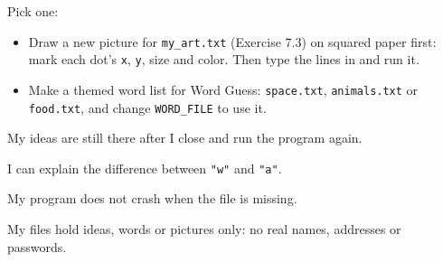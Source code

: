 \begin{creative}
Pick one:
\begin{itemize}[leftmargin=1.2em]
  \item Draw a new picture for \texttt{my\_art.txt} (Exercise 7.3) on squared paper first: mark each dot's \texttt{x}, \texttt{y}, size and color.
        Then type the lines in and run it.
  \item Make a themed word list for Word Guess: \texttt{space.txt}, \texttt{animals.txt} or \texttt{food.txt}, and change \texttt{WORD\_FILE} to use it.
\end{itemize}
\end{creative}

\begin{selfcheck}
  \item My ideas are still there after I close and run the program again.
  \item I can explain the difference between \texttt{"w"} and \texttt{"a"}.
  \item My program does not crash when the file is missing.
  \item My files hold ideas, words or pictures only: no real names, addresses or passwords.
\end{selfcheck}
